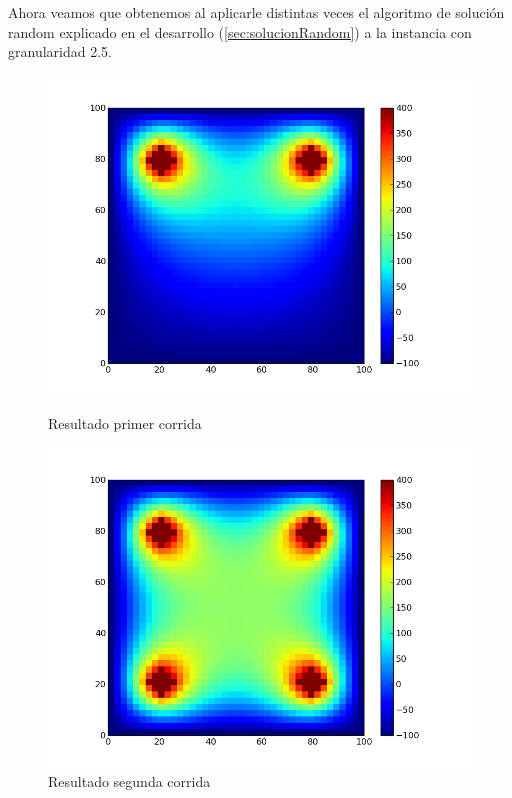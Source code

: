 Ahora veamos que obtenemos al aplicarle distintas veces el algoritmo de solución random explicado en el desarrollo (\ref{sec:solucionRandom}) a la instancia con granularidad 2.5.

\begin{figure}[htb]

\begin{center}
\includegraphics[scale=0.3]{imagenes/random_1.png} 
\caption{Resultado primer corrida} 
        \end{center}
\endminipage\hfill
{}
\begin{center}
\includegraphics[scale=0.3]{imagenes/random_2.png} 
\caption{Resultado segunda corrida} 
        \end{center}
\endminipage\hfill 
\end{figure}

